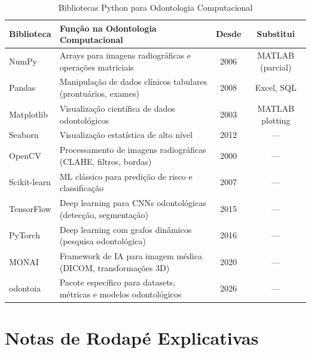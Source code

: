 \begin{table}[H]
  \centering
  \caption{Bibliotecas Python para Odontologia Computacional}
  \label{tab:bibliotecas-python}
  \begin{tabularx}{\textwidth}{lXcc}
    \toprule
    \textbf{Biblioteca} & \textbf{Função na Odontologia Computacional} & \textbf{Desde} & \textbf{Substitui} \\
    \midrule
    NumPy & Arrays para imagens radiográficas e operações matriciais & 2006 & MATLAB (parcial) \\
    Pandas & Manipulação de dados clínicos tabulares (prontuários, exames) & 2008 & Excel, SQL \\
    Matplotlib & Visualização científica de dados odontológicos & 2003 & MATLAB plotting \\
    Seaborn & Visualização estatística de alto nível & 2012 & — \\
    OpenCV & Processamento de imagens radiográficas (CLAHE, filtros, bordas) & 2000 & — \\
    Scikit-learn & ML clássico para predição de risco e classificação & 2007 & — \\
    TensorFlow & Deep learning para CNNs odontológicas (detecção, segmentação) & 2015 & — \\
    PyTorch & Deep learning com grafos dinâmicos (pesquisa odontológica) & 2016 & — \\
    MONAI & Framework de IA para imagem médica (DICOM, transformações 3D) & 2020 & — \\
    odontoia & Pacote específico para datasets, métricas e modelos odontológicos & 2026 & — \\
    \bottomrule
  \end{tabularx}
\end{table}

\section{Notas de Rodapé Explicativas}


